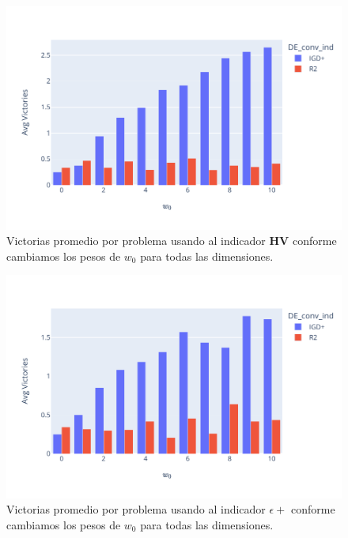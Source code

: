 \begin{figure} [H]
    \centering
    \includegraphics[width=\textwidth]{Figuras/borda_obj_ind_hv.pdf}
    \caption[Conteo de borda HV]{Victorias promedio por problema usando al indicador \textbf{HV} conforme cambiamos los pesos de $w_0$ para todas las dimensiones.}
    \label{fig:borda_hv}
\end{figure}

\begin{figure} [H]
    \centering
    \includegraphics[width=\textwidth]{Figuras/borda_obj_ind_eps+.pdf}
    \caption[Conteo de borda Epsilon +]{Victorias promedio por problema usando al indicador \textbf{$\epsilon +$} conforme cambiamos los pesos de $w_0$ para todas las dimensiones.}
    \label{fig:borda_epsp}
\end{figure}

